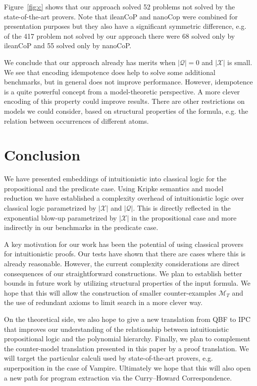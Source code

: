 \documentclass{easychair}
\theoremstyle{definition}
\theoremstyle{definition}
\theoremstyle{definition}
\theoremstyle{definition}
\theoremstyle{definition}
\theoremstyle{definition}
\theoremstyle{definition}
\begin{document}
Figure~\ref{fig:c} shows that our approach solved 52 problems not solved by the state-of-the-art provers. Note that ileanCoP and nanoCop were combined for presentation purposes but they also have a significant symmetric difference, e.g. of the 417 problem not solved by our approach there were 68 solved only by ileanCoP and 55 solved only by nanoCoP.

We conclude that our approach already has merits when $|\mathcal Q| = 0$ and $|\mathcal X|$ is small.
We see that encoding idempotence does help to solve some additional benchmarks, but in general does not improve performance.
However, idempotence is a quite powerful concept from a model-theoretic perspective. A more clever encoding of this property could improve results. There are other restrictions on models we could consider, based on structural properties of the formula, e.g. the relation between occurrences of different atoms.

\section{Conclusion}

We have presented embeddings of intuitionistic into classical logic for the propositional and the predicate case. Using Kripke semantics and model reduction we have established a complexity overhead of intuitionistic logic over classical logic parametrized by $|\mathcal X|$ and $|\mathcal Q|$. This is directly reflected in the exponential blow-up parametrized by $|\mathcal X|$ in the propositional case and more indirectly in our benchmarks in the predicate case.

A key motivation for our work has been the potential of using classical provers for intuitionistic proofs. Our tests have shown that there are cases where this is already reasonable.
However, the current complexity considerations are direct consequences of our straightforward constructions. We plan to establish better bounds in future work by utilizing structural properties of the input formula. We hope that this will allow the construction of smaller counter-examples $\mathcal M_T$ and the use of redundant axioms to limit search in a more clever way.

On the theoretical side, we also hope to give a new translation from QBF to IPC that improves our understanding of the relationship between intuitionistic propositional logic and the polynomial hierarchy.
Finally, we plan to complement the counter-model translation presented in this paper by a proof translation.
We will target the particular calculi used by state-of-the-art provers, e.g. superposition in the case of Vampire. Ultimately we hope that this will also open a new path for program extraction via the Curry--Howard Correspondence.
\end{document}
